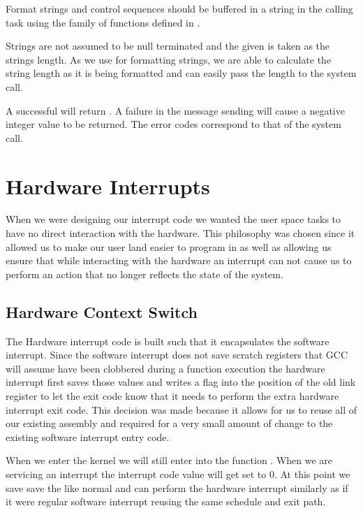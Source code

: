 \documentclass[pdftex,10pt,a4paper]{article}
\begin{document}
Format strings and control sequences should be buffered in a string in
the calling task using the  family of functions defined
in .

Strings are not assumed to be null terminated and the given
 is taken as the strings length. As we use 
for formatting strings, we are able to calculate the string length as
it is being formatted and can easily pass the length to the system
call.

A successful  will return . A failure in the message
sending will cause a negative integer value to be returned. The error
codes correspond to that of the  system call.


\section*{Hardware Interrupts}

When we were designing our interrupt code we wanted the user space tasks to
have no direct interaction with the hardware. This philosophy was chosen since
it allowed us to make our user land easier to program in as well as allowing us
ensure that while interacting with the hardware an interrupt can not cause us
to perform an action that no longer reflects the state of the system.

\subsection*{Hardware Context Switch}

The Hardware interrupt code is built such that it encapsulates the software
interrupt. Since the software interrupt does not save scratch registers that
GCC will assume have been clobbered during a function execution the hardware
interrupt first saves those values and writes a flag into the position of the
old link register to let the exit code know that it needs to perform the extra
hardware interrupt exit code. This decision was made because it allows for us
to reuse all of our existing assembly and required for a very small amount of
change to the existing software interrupt entry code.

When we enter the kernel we will still enter into the function
. When we are servicing an interrupt the interrupt code
value will get set to 0. At this point we save save the  like normal
and can perform the hardware interrupt similarly as if it were regular software
interrupt reusing the same schedule and exit path.
\end{document}

